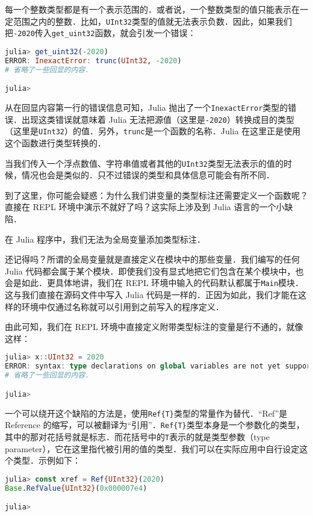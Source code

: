 每一个整数类型都是有一个表示范围的．或者说，一个整数类型的值只能表示在一定范围之内的整数．比如，\verb|UInt32|类型的值就无法表示负数．因此，如果我们把\verb|-2020|传入\verb|get_uint32|函数，就会引发一个错误：

\begin{lstlisting}[language=julia]
julia> get_uint32(-2020)
ERROR: InexactError: trunc(UInt32, -2020)
# 省略了一些回显的内容．

julia>  
\end{lstlisting}

从在回显内容第一行的错误信息可知，Julia 抛出了一个\verb|InexactError|类型的错误．出现这类错误就意味着 Julia 无法把源值（这里是\verb|-2020|）转换成目的类型（这里是\verb|UInt32|）的值．另外，\verb|trunc|是一个函数的名称．Julia 在这里正是使用这个函数进行类型转换的．

当我们传入一个浮点数值、字符串值或者其他的\verb|UInt32|类型无法表示的值的时候，情况也会是类似的．只不过错误的类型和具体信息可能会有所不同．

到了这里，你可能会疑惑：为什么我们讲变量的类型标注还需要定义一个函数呢？直接在 REPL 环境中演示不就好了吗？这实际上涉及到 Julia 语言的一个小缺陷．

在 Julia 程序中，我们无法为全局变量添加类型标注．

还记得吗？所谓的全局变量就是直接定义在模块中的那些变量．我们编写的任何 Julia 代码都会属于某个模块．即使我们没有显式地把它们包含在某个模块中，也会是如此．更具体地讲，我们在 REPL 环境中输入的代码默认都属于\verb|Main|模块．这与我们直接在源码文件中写入 Julia 代码是一样的．正因为如此，我们才能在这样的环境中仅通过名称就可以引用到之前写入的程序定义．

由此可知，我们在 REPL 环境中直接定义附带类型标注的变量是行不通的，就像这样：

\begin{lstlisting}[language=julia]
julia> x::UInt32 = 2020
ERROR: syntax: type declarations on global variables are not yet supported
# 省略了一些回显的内容．

julia> 
\end{lstlisting}

一个可以绕开这个缺陷的方法是，使用\verb|Ref{T}|类型的常量作为替代．“Ref”是 Reference 的缩写，可以被翻译为“引用”．\verb|Ref{T}|类型本身是一个参数化的类型，其中的那对花括号就是标志．而花括号中的\verb|T|表示的就是类型参数（type parameter），它在这里指代被引用的值的类型．我们可以在实际应用中自行设定这个类型．示例如下：

\begin{lstlisting}[language=julia]
julia> const xref = Ref{UInt32}(2020)
Base.RefValue{UInt32}(0x000007e4)

julia> 
\end{lstlisting}


